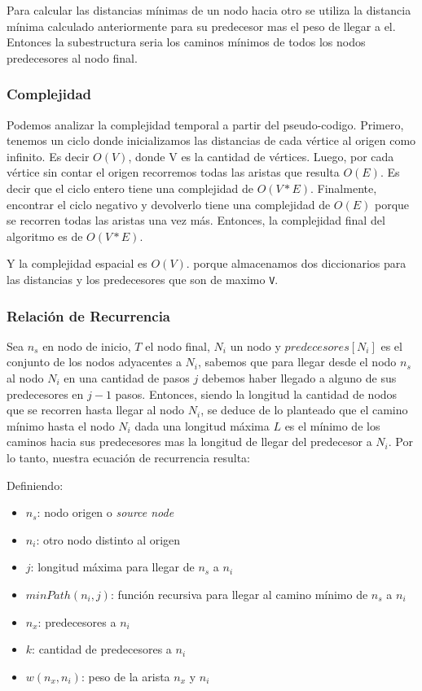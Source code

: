 \documentclass[titlepage,a4paper]{article}
\begin{document}
Para calcular las distancias mínimas de un nodo hacia otro se utiliza la
distancia mínima calculado anteriormente para su predecesor mas el peso de
llegar a el. Entonces la subestructura seria los caminos mínimos de todos los
nodos predecesores al nodo final.

\subsubsection{Complejidad}
\label{sec:org7d43448}

Podemos analizar la complejidad temporal a partir del pseudo-codigo. Primero,
tenemos un ciclo donde inicializamos las distancias de cada vértice al origen
como infinito. Es decir \(O(V)\), donde V es la cantidad de vértices. Luego, por
cada vértice sin contar el origen recorremos todas las aristas que resulta
\(O(E)\). Es decir que el ciclo entero tiene una complejidad de \(O(V * E)\).
Finalmente, encontrar el ciclo negativo y devolverlo tiene una complejidad de
\(O(E)\) porque se recorren todas las aristas una vez más.  Entonces, la
complejidad final del algoritmo es de \(O(V * E)\).

Y la complejidad espacial es \(O(V)\). porque almacenamos dos diccionarios para
las distancias y los predecesores que son de maximo \texttt{V}.

\subsubsection{Relación de Recurrencia}
\label{sec:org987a071}

Sea \(n_s\) en nodo de inicio, \(T\) el nodo final, \(N_i\) un nodo y \(predecesores[N_i]\) es el
conjunto de los nodos adyacentes a \(N_i\), sabemos que para llegar desde el nodo \(n_s\)
al nodo \(N_i\) en una cantidad de pasos \(j\) debemos haber llegado a alguno de sus
predecesores en \(j-1\) pasos. Entonces, siendo la longitud la cantidad de nodos que
se recorren hasta llegar al nodo \(N_i\), se deduce de lo planteado que el camino
mínimo hasta el nodo \(N_i\) dada una longitud máxima \(L\) es el mínimo de los caminos
hacia sus predecesores mas la longitud de llegar del predecesor a \(N_i\). Por lo
tanto, nuestra ecuación de recurrencia resulta:

Definiendo:
\begin{itemize}
\item \(n_s\): nodo origen o \emph{source node}
\item \(n_i\): otro nodo distinto al origen
\item \(j\): longitud máxima para llegar de \(n_s\) a \(n_i\)
\item \(minPath(n_i, j)\): función recursiva para llegar al camino mínimo de \(n_s\) a \(n_i\)
\item \(n_x\): predecesores a \(n_i\)
\item \(k\): cantidad de predecesores a \(n_i\)
\item \(w(n_x,n_i)\): peso de la arista \(n_x\) y \(n_i\)
\end{itemize}
\end{document}
